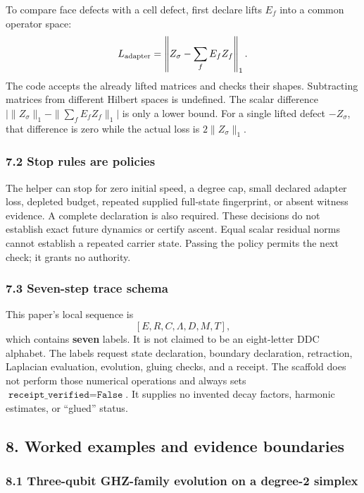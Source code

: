 \documentclass[
  11pt,
]{article}
\begin{document}
To compare face defects with a cell defect, first declare lifts \(E_f\)
into a common operator space:
\[
L_{\rm adapter}=
\left\|Z_\sigma-\sum_f E_fZ_f\right\|_1.
\]
The code accepts the already lifted matrices and checks their shapes.
Subtracting matrices from different Hilbert spaces is undefined.
The scalar difference
\(\bigl|\|Z_\sigma\|_1-\|\sum_fE_fZ_f\|_1\bigr|\) is only a lower bound.
For a single lifted defect \(-Z_\sigma\), that difference is zero while
the actual loss is \(2\|Z_\sigma\|_1\).

\subsubsection{7.2 Stop rules are policies}\label{stop-rules-are-policies}

The helper can stop for zero initial speed, a degree cap, small declared
adapter loss, depleted budget, repeated supplied full-state fingerprint,
or absent witness evidence. A complete declaration is also required.
These decisions do not establish exact future dynamics or certify ascent.
Equal scalar residual norms cannot establish a repeated carrier state.
Passing the policy permits the next check; it grants no authority.

\subsubsection{7.3 Seven-step trace schema}\label{seven-step-trace-schema}

This paper's local sequence is
\[
[E,R,C,\Lambda,D,M,T],
\]
which contains \textbf{seven} labels. It is not claimed to be an eight-letter
DDC alphabet. The labels request state declaration, boundary declaration,
retraction, Laplacian evaluation, evolution, gluing checks, and a receipt.
The scaffold does not perform those numerical operations and always sets
\(\texttt{receipt\_verified}=\texttt{False}\).
It supplies no invented decay factors, harmonic estimates, or ``glued'' status.

\subsection{8. Worked examples and evidence boundaries}\label{worked-examples-and-evidence-boundaries}

\subsubsection{8.1 Three-qubit GHZ-family evolution on a degree-2 simplex}\label{three-qubit-ghz-family-evolution-on-a-degree-2-simplex}
\end{document}
